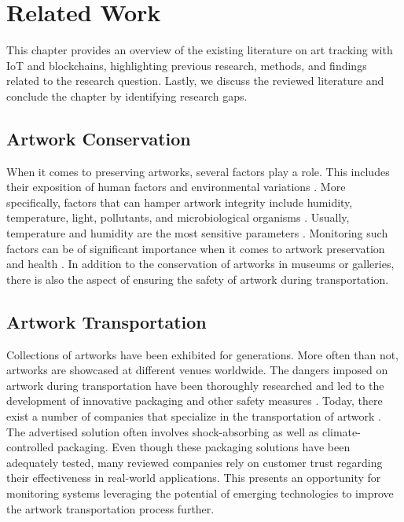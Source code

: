 \chapter{Related Work}
\label{chap:related_work}
This chapter provides an overview of the existing literature on art tracking with IoT and blockchains, highlighting previous research, methods, and findings related to the research question. Lastly, we discuss the reviewed literature and conclude the chapter by identifying research gaps.

\section{Artwork Conservation}
When it comes to preserving artworks, several factors play a role. This includes their exposition of human factors and environmental variations \cite{woodenartworkmonitoring}. More specifically, factors that can hamper artwork integrity include humidity, temperature, light, pollutants, and microbiological organisms \cite{riskassessment}. Usually, temperature and humidity are the most sensitive parameters \cite{riskassessment}. Monitoring such factors can be of significant importance when it comes to artwork preservation and health \cite{environmentmonitoring}. In addition to the conservation of artworks in museums or galleries, there is also the aspect of ensuring the safety of artwork during transportation. 

\section{Artwork Transportation}
Collections of artworks have been exhibited for generations. More often than not, artworks are showcased at different venues worldwide. The dangers imposed on artwork during transportation have been thoroughly researched and led to the development of innovative packaging and other safety measures \cite{artintransit}. Today, there exist a number of companies that specialize in the transportation of artwork \cite{kraftels} \cite{hasenkamp} \cite{weltifurrer}. The advertised solution often involves shock-absorbing as well as climate-controlled packaging. Even though these packaging solutions have been adequately tested, many reviewed companies rely on customer trust regarding their effectiveness in real-world applications. This presents an opportunity for monitoring systems leveraging the potential of emerging technologies to improve the artwork transportation process further.

